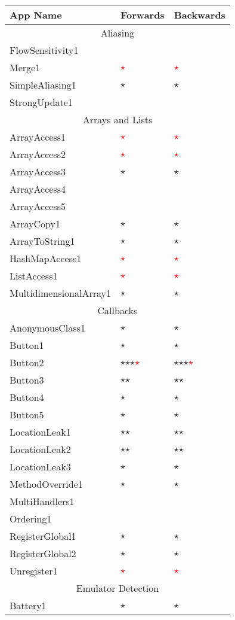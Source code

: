 \documentclass[../draft.tex]{subfiles}
\newcommand{\fp}{\textcolor{white}{\textcircled{\textcolor{red}{$\star$}}}}
\newcommand{\tp}[0]{\textcircled{$\star$}}
\newcommand{\tsub}[1]{\multicolumn{3}{c}{#1}\\\hline}
\begin{document}
    \begin{longtable}{l | l | l}%
        \textbf{App Name} & \textbf{Forwards} & \textbf{Backwards}\\
        \hline\hline
        \endhead
        \tsub{Aliasing}
        FlowSensitivity1 & &\\
        Merge1 & \fp & \fp\\
        SimpleAliasing1 & \tp & \tp\\
        StrongUpdate1 & &\\
        \hline
        \tsub{Arrays and Lists}
        ArrayAccess1 & \fp & \fp\\
        ArrayAccess2 & \fp & \fp\\
        ArrayAccess3 & \tp & \tp\\
        ArrayAccess4 &  & \\
        ArrayAccess5 &  & \\
        ArrayCopy1 & \tp & \tp\\
        ArrayToString1 & \tp & \tp\\
        HashMapAccess1 & \fp & \fp\\
        ListAccess1 & \fp & \fp\\
        MultidimensionalArray1 & \tp & \tp\\
        \hline
        \tsub{Callbacks}
        AnonymousClass1 & \tp & \tp\\
        Button1 & \tp & \tp \\
        Button2 & \tp \tp \tp \fp & \tp \tp \tp \fp\\
        Button3 & \tp \tp & \tp \tp\\
        Button4 & \tp & \tp\\
        Button5 & \tp & \tp\\
        LocationLeak1 & \tp \tp & \tp \tp\\
        LocationLeak2 & \tp \tp & \tp \tp\\
        LocationLeak3 & \tp & \tp\\
        MethodOverride1 & \tp & \tp\\
        MultiHandlers1 & & \\
        Ordering1 & & \\
        RegisterGlobal1 & \tp & \tp\\
        RegisterGlobal2 & \tp & \tp\\
        Unregister1 & \fp & \fp\\
        \hline
        \tsub{Emulator Detection}
        Battery1 & \tp & \tp\\

\end{longtable}
\end{document}

